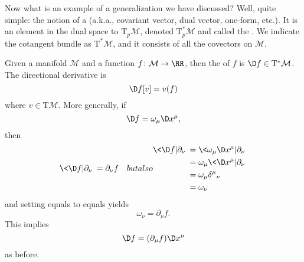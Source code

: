 Now what is an example of a generalization we have discussed?
Well, quite simple: the notion of a  (a.k.a.,
covariant vector, dual vector, one-form, etc.). It is an element
in the dual space to $\mathrm{T}_{p}\mathcal{M}$, denoted
$\mathrm{T}^{*}_{p}\mathcal{M}$ and called the .
We indicate the cotangent bundle as $\mathrm{T}^{*}\mathcal{M}$,
and it consists of all the covectors on $\mathcal{M}$.

\begin{ex}
Given a manifold $\mathcal{M}$ and a function
$f\colon\mathcal{M}\to\RR$, then the  of $f$ is
$\D f\in \mathrm{T}^{*}\mathcal{M}$. The directional derivative
is
\begin{equation}
\D f[v]=v(f)
\end{equation}
where $v\in\mathrm{T}\mathcal{M}$. More generally, if
\begin{equation}
\D f=\omega_{\mu}\D x^{\mu},
\end{equation}
then
\begin{subequations}
\begin{align}
\<\D f|\partial_{\nu}\>
&=\partial_{\nu} f
\end{align}
but also
\begin{align}
\<\D f|\partial_{\nu}\>
&=\<\omega_{\mu}\D x^{\mu}|\partial_{\nu}\>\\
&=\omega_{\mu}\<\D x^{\mu}|\partial_{\nu}\>\\
&=\omega_{\mu}{\delta^{\mu}}_{\nu}\\
&=\omega_{\nu}
\end{align}
\end{subequations}
and setting equals to equals yields
\begin{equation}
\omega_{\nu}=\partial_{\nu} f.
\end{equation}
This implies
\begin{equation}
\D f=(\partial_{\mu}f)\D x^{\mu}
\end{equation}
as before.
\end{ex}
